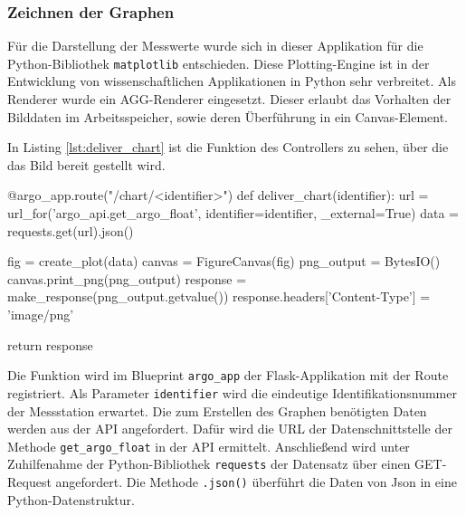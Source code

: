\subsubsection{Zeichnen der Graphen} \label{sec:ImplementierungPLOTS}


Für die Darstellung der Messwerte wurde sich in dieser Applikation für die Python-Bibliothek \texttt{matplotlib} entschieden.  Diese Plotting-Engine ist in der Entwicklung von wissenschaftlichen Applikationen in Python sehr verbreitet.
Als Renderer wurde ein AGG-Renderer eingesetzt. Dieser erlaubt das Vorhalten der Bilddaten im Arbeitsspeicher, sowie deren Überführung in ein Canvas-Element.

In Listing \ref{lst:deliver_chart} ist die Funktion des \gls{Controller}s zu sehen, über die das Bild bereit gestellt wird.

\begin{python}[label={lst:deliver_chart}, caption={Ausliefern eines Funktionsplots Flask}]
@argo_app.route("/chart/<identifier>")
def deliver_chart(identifier):
    url = url_for('argo_api.get_argo_float', identifier=identifier, _external=True)
    data = requests.get(url).json()

    fig = create_plot(data)
    canvas = FigureCanvas(fig)
    png_output = BytesIO()
    canvas.print_png(png_output)
    response = make_response(png_output.getvalue())
    response.headers['Content-Type'] = 'image/png'

    return response
\end{python}
\pagebreak
Die Funktion wird im Blueprint \texttt{argo\_app} der Flask-Applikation mit der Route registriert. Als Parameter \texttt{identifier}  wird die eindeutige Identifikationsnummer der Messstation erwartet. Die zum Erstellen des Graphen benötigten Daten werden aus der \gls{API} angefordert. Dafür wird die URL der Datenschnittstelle der Methode \texttt{get\_argo\_float} in der \gls{API} ermittelt. Anschließend wird unter Zuhilfenahme der Python-Bibliothek \texttt{requests} der Datensatz über einen GET-Request angefordert. Die Methode \texttt{.json()} überführt die Daten von Json in eine Python-Datenstruktur.

